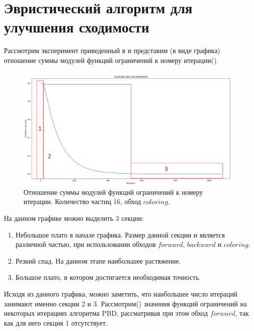 \section{Эвристический алгоритм для улучшения сходимости} \label{ch3:sec2}
	Рассмотрим эксперимент приведенный в  и представим (в виде графика) отношение суммы модулей функций ограничений к номеру итерации(). 

\begin{figure}[ht!] 
	\center
	\includegraphics [scale=0.4] {my_folder/images//plot_16_coloring.png}
	\caption{Отношение суммы модулей функций ограничений к номеру итерации. Количество частиц 16, обход $coloring$.}
	\label{fig:csum-over-iterations}  
\end{figure}	

	На данном графике можно выделить 3 секции:
	\begin{enumerate}[1.]
		\item Небольшое плато в начале графика. Размер данной секции и является различной частью, при использовании обходов $forward$, $backward$ и $coloring$.
		\item Резкий спад. На данном этапе   наибольшее растяжение.
		\item Большое плато, в котором достигается необходимая точность.
	\end{enumerate}

	Исходя из данного графика, можно заметить, что наибольшее число итераций занимают именно секции 2 и 3. Рассмотрим() значения функций ограничений на некоторых итерациях алгоритма PBD, рассматривая при этом обход $forward$, так как для него секция 1 отсутствует.
	
